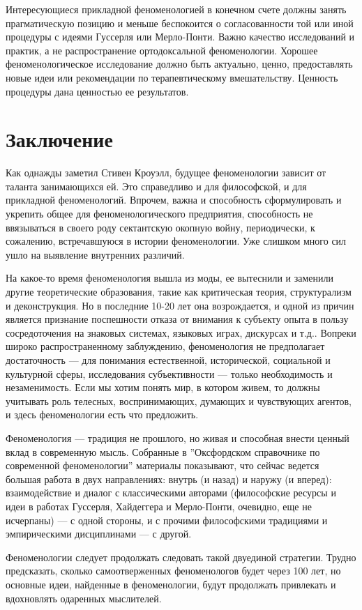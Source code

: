 \documentclass[11pt]{book}
\begin{document}
Интересующиеся прикладной феноменологией в конечном счете должны занять прагматическую позицию и меньше беспокоится о согласованности той или иной процедуры с идеями Гуссерля или Мерло-Понти. Важно качество исследований и практик, а не распространение ортодоксальной феноменологии. Хорошее феноменологическое исследование должно быть актуально, ценно, предоставлять новые идеи или рекомендации по терапевтическому вмешательству. Ценность процедуры дана ценностью ее результатов.

\chapter{Заключение}

Как однажды заметил Стивен Кроуэлл, будущее феноменологии зависит от таланта занимающихся ей. Это справедливо и для философской, и для прикладной феноменологий. Впрочем, важна и способность сформулировать и укрепить общее для феноменологического предприятия, способность не ввязываться в своего роду сектантскую окопную войну, периодически, к сожалению, встречавшуюся в истории феноменологии. Уже слишком много сил ушло на выявление внутренних различий.

На какое-то время феноменология вышла из моды, ее вытеснили и заменили другие теоретические образования, такие как критическая теория, структурализм и деконструкция. Но в последние 10-20 лет она возрождается, и одной из причин является признание поспешности отказа от внимания к субъекту опыта в пользу сосредоточения на знаковых системах, языковых играх, дискурсах и т.д.. Вопреки широко распространенному заблуждению, феноменология не предполагает достаточность --- для понимания естественной, исторической, социальной и культурной сферы, исследования субъективности --- только необходимость и незаменимость. Если мы хотим понять мир, в котором живем, то должны учитывать роль телесных, воспринимающих, думающих и чувствующих агентов, и здесь феноменологии есть что предложить.

Феноменология --- традиция не прошлого, но живая и способная внести ценный вклад в современную мысль. Собранные в ''Оксфордском справочнике по современной феноменологии'' материалы показывают, что сейчас ведется большая работа в двух направлениях: внутрь (и назад) и наружу (и вперед): взаимодействие и диалог с классическими авторами (философские ресурсы и идеи в работах Гуссерля, Хайдеггера и Мерло-Понти, очевидно, еще не исчерпаны) --- с одной стороны, и с прочими философскими традициями и эмпирическими дисциплинами --- с другой.

Феноменологии следует продолжать следовать такой двуединой стратегии. Трудно предсказать, сколько самоотверженных феноменологов будет через 100 лет, но основные идеи, найденные в феноменологии, будут продолжать привлекать и вдохновлять одаренных мыслителей.
\end{document}
